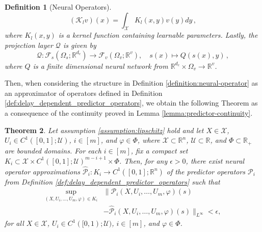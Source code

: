 \documentclass[letterpaper, 10 pt, conference]{ieeeconf}  %
\newtheorem{theorem}{Theorem}
\newtheorem{definition}[theorem]{Definition}
\begin{document}
\begin{definition}[Neural Operators]
\begin{equation} \label{eq:generalKernel}
    (\mathcal{K}_lv)(x) = \int_\mathcal{X} K_l(x, y) v(y) dy\,,
\end{equation}
where $K_l(x, y)$ is a kernel function containing learnable parameters. Lastly, the projection layer $\mathcal{Q}$ is given by 
\begin{equation}
    \mathcal{Q} : \mathcal{F}_s(\Omega_s; \mathbb{R}^{d_c}) \rightarrow \mathcal{F}_v(\Omega_v; \mathbb{R}^v), \quad s(x) \mapsto Q(s(x), y)\,, 
\end{equation}
where $Q$ is a finite dimensional neural network from $\mathbb{R}^{d_c} \times \Omega_v \rightarrow \mathbb{R}^v$. 
\end{definition}

Then, when considering the structure in Definition \ref{definition:neural-operator} as an approximator of operators defined in Definition \ref{def:delay_dependent_predictor_operators}, we obtain the following Theorem as a consequence of the continuity proved in Lemma \ref{lemma:predictor-continuity}. 
\begin{theorem}\label{thm:neural-op-approximate-predictor-theorem}
Let assumption \ref{assumption:lipschitz} hold and let $X \in \mathcal{X}$, $U_i \in C^1([0,1];\mathcal{U})$, $i \in [m]$, and $\varphi \in \Phi$, where $\mathcal{X} \subset \mathbb{R}^n$, $\mathcal{U} \subset \mathbb{R}$, and $\Phi \subset \mathbb{R}_+$ are bounded domains. For each $i \in [m]$, fix a compact set $K_i \subset \mathcal{X} \times C^1([0,1];\mathcal{U})^{m-i+1} \times \Phi$. Then, for any $\epsilon > 0$, there exist neural operator approximations $\hat{\mathcal{P}}_i: K_i \to C^1([0,1];\mathbb{R}^n)$ of the predictor operators $\mathcal{P}_i$ from Definition \ref{def:delay_dependent_predictor_operators} such that
\begin{align}
\sup_{(X,U_i,\ldots,U_m,\varphi) \in K_i}&   
\|\mathcal{P}_i(X,U_i,\ldots,U_m,\varphi)(s) \nonumber \\ & - \hat{\mathcal{P}}_i(X,U_i,\ldots,U_m,\varphi)(s)\|_{L^\infty} < \epsilon,
\end{align}
for all $X \in \mathcal{X}$, $U_i \in C^1([0,1);\mathcal{U})$, $i \in [m]$, and $\varphi \in \Phi$.
\end{theorem}
\end{document}
